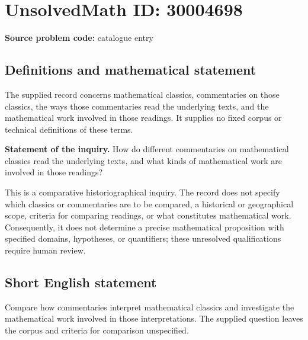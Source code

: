 \documentclass[11pt]{article}
\begin{document}
\section*{UnsolvedMath ID: 30004698}
\textbf{Source problem code:} catalogue entry
\subsection{Definitions and mathematical statement}
The supplied record concerns mathematical classics, commentaries on those classics, the ways those commentaries read the underlying texts, and the mathematical work involved in those readings. It supplies no fixed corpus or technical definitions of these terms.

\textbf{Statement of the inquiry.} How do different commentaries on mathematical classics read the underlying texts, and what kinds of mathematical work are involved in those readings?

This is a comparative historiographical inquiry. The record does not specify which classics or commentaries are to be compared, a historical or geographical scope, criteria for comparing readings, or what constitutes mathematical work. Consequently, it does not determine a precise mathematical proposition with specified domains, hypotheses, or quantifiers; these unresolved qualifications require human review.
\subsection{Short English statement}
Compare how commentaries interpret mathematical classics and investigate the mathematical work involved in those interpretations. The supplied question leaves the corpus and criteria for comparison unspecified.
\end{document}
